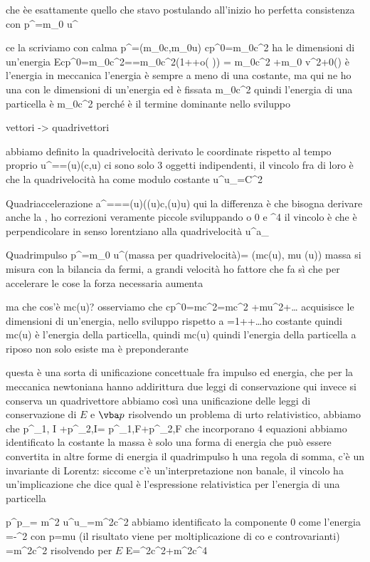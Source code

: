 {che èe esattamente quello che stavo postulando all'inizio
ho perfetta consistenza con p^\mu=m_0 u^\mu


ce la scriviamo con calma
	p^\mu=(m_0c\gamma,m_0\gamma\vba u)
	cp^0=m_0c^2\gamma
ha le dimensioni di un'energia
	E\equiv cp^0=m_0c^2\gamma==m_0c^2\left(1++o\left(	\right)\right) = m_0c^2 +m_0 v^2+0\left(\right)
è l'energia 
in meccanica l'energia è sempre a meno di una costante, ma qui ne ho una con le dimensioni di un'energia ed è fissata m_0c^2
quindi l'energia di una particella è m_0c^2 perché è il termine dominante nello sviluppo



vettori -> quadrivettori

abbiamo definito la quadrivelocità  derivato le coordinate rispetto al tempo proprio
	u^\mu==\gamm(u)(c,\vba u)
ci sono solo 3 oggetti indipendenti, il vincolo fra di loro è che la quadrivelocità ha come modulo costante u^\mu u_\mu=C^2

Quadriaccelerazione
	a^\mu===\gamma(u)(\gamma(u)c,\gamma(u)\vba u)
qui la differenza è che bisogna derivare anche la \gamma, ho correzioni veramente piccole sviluppando o 0 e \beta^4
il vincolo è che è perpendicolare in senso lorentziano alla quadrivelocità 	
	u^\mu a_

Quadrimpulso
	p^\mu=m_0 u^\mu (massa per quadrivelocità)= (mc\gamma(u), m\vba u \gamma(u))
	massa si misura con la bilancia da fermi, a grandi velocità ho fattore \gamma che fa sì che per accelerare le cose la forza necessaria aumenta

ma che cos'è mc\gamma(u)?
osserviamo che 
	cp^0=mc^2\gamma=mc^2 +mu^2+\dots
acquisisce le dimensioni di un'energia, nello sviluppo rispetto a =1++\dots ho costante 
quindi mc\gamma(u) è l'energia della particella, quindi mc\gamma(u)\equiv {}
quindi l'energia della particella a riposo non solo esiste ma è preponderante

questa è una sorta di unificazione concettuale fra impulso ed energia, che per la meccanica newtoniana hanno addirittura due leggi di conservazione
qui invece si conserva un quadrivettore
abbiamo così una unificazione delle leggi di conservazione di $E$ e $\vba p$
risolvendo un problema di urto relativistico, abbiamo che
	p^\mu_{1, I} +p^\mu_{2,I}= p^\mu_{1,F}+p^\mu_{2,F}
che incorporano 4 equazioni
abbiamo identificato la costante
la massa è solo una forma di energia che può essere convertita in altre forme di energia
il quadrimpulso h una regola di somma, c'è un invariante di Lorentz: siccome c'è un'interpretazione non banale, il vincolo ha un'implicazione che dice qual è l'espressione relativistica per l'energia di una particella

	p^\mu p_\mu= m^2 u^\mu u_\mu=m^2c^2
abbiamo identificato la componente 0 come l'energia
	=-^2 con \vba p=m\gamma \vba u (il risultato viene per moltiplicazione di co e controvarianti)
	=m^2c^2
risolvendo per $E$
	E=^2c^2+m^2c^4}
